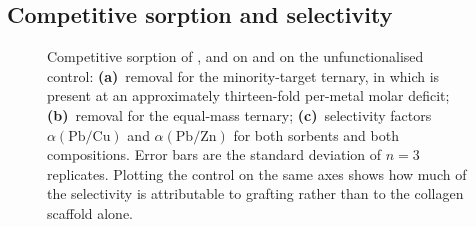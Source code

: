 \subsection{Competitive sorption and selectivity}
\label{sec:results-competition}
%
%

\begin{figure}[htbp]
  \centering
  \caption[Competitive sorption and selectivity factors]{Competitive sorption of \PbII{}, \CuII{} and \ZnII{} on \TAOSS{} and on the unfunctionalised \RAWOSS{} control: \textbf{(a)}~removal for the minority-target ternary, in which \PbII{} is present at an approximately thirteen-fold per-metal molar deficit; \textbf{(b)}~removal for the equal-mass ternary; \textbf{(c)}~selectivity factors $\alpha(\mathrm{Pb/Cu})$ and $\alpha(\mathrm{Pb/Zn})$ for both sorbents and both compositions. Error bars are the standard deviation of $n = 3$ replicates. Plotting the control on the same axes shows how much of the selectivity is attributable to grafting rather than to the collagen scaffold alone.}
  \label{fig:selectivity}
\end{figure}


